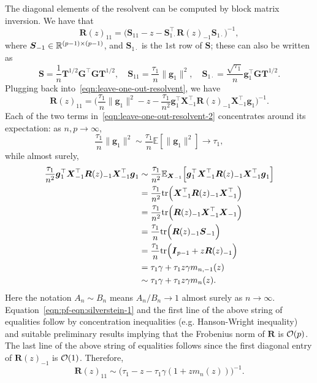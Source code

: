 \documentclass{article}
\newcommand{\bg}{\boldsymbol{g}}
\newcommand{\bX}{\boldsymbol{X}}
\newcommand{\bS}{\boldsymbol{S}}
\newcommand{\bT}{\boldsymbol{T}}
\newcommand{\bG}{\boldsymbol{G}}
\newcommand{\bR}{\boldsymbol{R}}
\newcommand{\bI}{\boldsymbol{I}}
\begin{document}
The diagonal elements of the resolvent can be computed by block matrix inversion. We have that 
\begin{equation}
	\label{eqn:leave-one-out-resolvent}
	\bR(z)_{11} = \bigg(\bS_{11} - z - \bS_{1\cdot}^{\top} \bR(z)_{-1} \bS_{1\cdot}\bigg)^{-1},
\end{equation}
where $\bS_{-1} \in \Reals^{(p - 1) \times (p - 1)}$, and $\bS_{1\cdot}$ is the $1$st row of $\bS$; these can also be written as 
$$
\bS = \frac{1}{n} \bT^{1/2} \bG^{\top} \bG \bT^{1/2}, \quad \bS_{11} = \frac{\tau_1}{n}\|\bg_1\|^2, \quad \bS_{1\cdot} = \frac{\sqrt{\tau_1}}{n} \bg_1^{\top} \bG \bT^{1/2}.
$$
Plugging back into~\eqref{eqn:leave-one-out-resolvent}, we have
\begin{equation}
	\label{eqn:leave-one-out-resolvent-2}
	\bR(z)_{11} = \bigg(\frac{\tau_1}{n}\|\bg_1\|^2 - z - \frac{\tau_1}{n^2} \bg_1^{\top} \bX_{-1}^{\top} \bR(z)_{-1} \bX_{-1}^{\top} \bg_1\bigg)^{-1}.
\end{equation}
Each of the two terms in~\eqref{eqn:leave-one-out-resolvent-2} concentrates around its expectation: as $n,p \to \infty$,
\begin{equation}
	\label{eqn:pf-eqn:silverstein-1}
	\frac{\tau_1}{n}\|\bg_1\|^2 \sim \frac{\tau_1}{n}\mathbb{E}[\|\bg_1\|^2] \to \tau_1,
\end{equation}
while almost surely,
\begin{align}
	\frac{\tau_1}{n^2} \bg_1^{\top} \bX_{-1}^{\top} \bR(z)_{-1} \bX_{-1}^{\top} \bg_1 
	& \sim \frac{\tau_1}{n^2} \mathbb{E}_{\bX_{-1}}\Big[\bg_1^{\top} \bX_{-1}^{\top} \bR(z)_{-1} \bX_{-1}^{\top} \bg_1\Big] \\
	& = \frac{\tau_1}{n^2} \tr\Big(\bX_{-1}^{\top} \bR(z)_{-1} \bX_{-1}^{\top}\Big) \\
	& = \frac{\tau_1}{n^2} \tr\Big(\bR(z)_{-1} \bX_{-1}^{\top} \bX_{-1} \Big) \\
	& = \frac{\tau_1}{n} \tr\Big(\bR(z)_{-1} \bS_{-1} \Big) \\
	& = \frac{\tau_1}{n} \tr\Big(\bI_{p - 1} + z \bR(z)_{-1} \Big) \\
	& = \tau_1 \gamma + \tau_1 z \gamma m_{n,-1}(z) \\
	& \sim \tau_1 \gamma + \tau_1 z \gamma m_{n}(z).
	\label{eqn:almost-sure-convergence-diagonal-resolvent}
\end{align}
Here the notation $A_n \sim B_n$ means $A_n/B_n \to 1$ almost surely as $n \to \infty$. Equation~\eqref{eqn:pf-eqn:silverstein-1} and the first line of the above string of equalities follow by concentration inequalities (e.g. Hanson-Wright inequality) and suitable preliminary results implying that the Frobenius norm of $\bR$ is $\mathcal{O}(p)$.  The last line of the above string of equalities follows since the first diagonal entry of $\bR(z)_{-1}$ is $\mathcal{O}(1)$. Therefore,
\begin{equation}
	\label{eqn:resolvent-diagonal}
	\bR(z)_{11} \sim \bigg(\tau_1 - z - \tau_1 \gamma(1 + z m_n(z))\bigg)^{-1}.
\end{equation}
\end{document}
